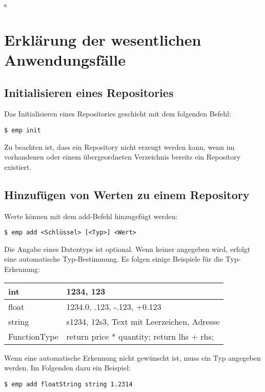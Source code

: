 s%


\section{Erklärung der wesentlichen Anwendungsfälle}

\subsection{Initialisieren eines Repositories}
Das Initialisieren eines Repositories geschieht mit dem folgenden Befehl:
\begin{lstlisting}[style=Bash]
$ emp init
\end{lstlisting}
Zu beachten ist, dass ein Repository nicht erzeugt werden kann, wenn im vorhandenen oder einem übergeordneten Verzeichnis bereits ein Repository existiert.

\subsection{Hinzufügen von Werten zu einem Repository}
Werte können mit dem add-Befehl hinzugefügt werden:
\begin{lstlisting}[style=Bash]
$ emp add <Schlüssel> [<Typ>] <Wert>
\end{lstlisting}
Die Angabe eines Datentyps ist optional. Wenn keiner angegeben wird, erfolgt eine automatische Typ-Bestimmung.
Es folgen einige Beispiele für die Typ-Erkennung:

\vspace{0.5em}

\begin{tabular}{| l | l |}
	\hline
	int & 1234, 123 \\
	\hline
	float & 1234.0, .123, -.123, +0.123 \\
	\hline
	string & s1234, 12s3, \grqq Text mit Leerzeichen\grqq , Adresse \\
	\hline
	FunctionType & \grqq return price * quantity; return lhs + rhs;\grqq\\
	\hline
\end{tabular}

\vspace{0.5em}

Wenn eine automatische Erkennung nicht gewünscht ist, muss ein Typ angegeben werden. Im Folgenden dazu ein Beispiel:
\begin{lstlisting}[style=Bash]
$ emp add floatString string 1.2314
\end{lstlisting}

